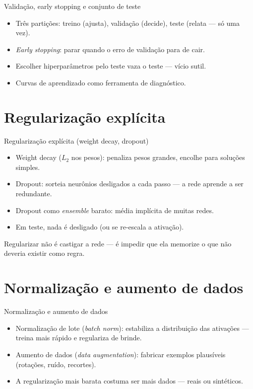 \documentclass[aspectratio=169, 11pt]{beamer}
\begin{document}
\begin{frame}{Validação, early stopping e conjunto de teste}
  \begin{itemize}\setlength{\itemsep}{0.4ex}
    \item Três partições: treino (ajusta), validação (decide), teste (relata
          — só uma vez).
    \item \emph{Early stopping}: parar quando o erro de validação para de cair.
    \item Escolher hiperparâmetros pelo teste vaza o teste — vício sutil.
    \item Curvas de aprendizado como ferramenta de diagnóstico.
  \end{itemize}
\end{frame}

\section{Regularização explícita}

\begin{frame}{Regularização explícita (weight decay, dropout)}
  \begin{itemize}\setlength{\itemsep}{0.4ex}
    \item Weight decay ($L_2$ nos pesos): penaliza pesos grandes, encolhe para
          soluções simples.
    \item Dropout: sorteia neurônios desligados a cada passo — a rede aprende a
          ser redundante.
    \item Dropout como \emph{ensemble} barato: média implícita de muitas redes.
    \item Em teste, nada é desligado (ou se re-escala a ativação).
  \end{itemize}
  \begin{ideiabox}
    Regularizar não é castigar a rede — é impedir que ela memorize o que não
    deveria existir como regra.
  \end{ideiabox}
\end{frame}

\section{Normalização e aumento de dados}

\begin{frame}{Normalização e aumento de dados}
  \begin{itemize}\setlength{\itemsep}{0.4ex}
    \item Normalização de lote (\emph{batch norm}): estabiliza a distribuição
          das ativações — treina mais rápido e regulariza de brinde.
    \item Aumento de dados (\emph{data augmentation}): fabricar exemplos
          plausíveis (rotações, ruído, recortes).
    \item A regularização mais barata costuma ser mais dados — reais ou
          sintéticos.
  \end{itemize}
\end{frame}
\end{document}
